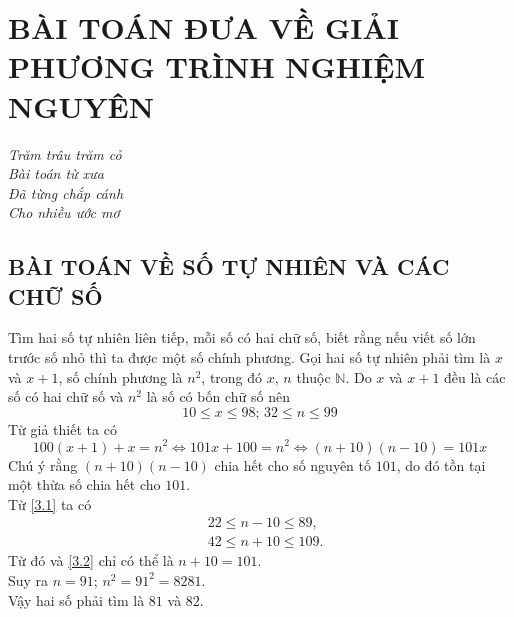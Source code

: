 \chapter{BÀI TOÁN ĐƯA VỀ GIẢI PHƯƠNG TRÌNH NGHIỆM NGUYÊN}

\begin{flushright}
 \textit{Trăm trâu trăm cỏ\\
 Bài toán từ xưa\\
 Đã từng chắp cánh\\
 Cho nhiều ước mơ}
\end{flushright}

\section{BÀI TOÁN VỀ SỐ TỰ NHIÊN VÀ CÁC CHỮ SỐ}

\begin{vd}
 Tìm hai số tự nhiên liên tiếp, mỗi số có hai chữ số, biết rằng nếu viết số lớn trước số nhỏ thì ta được một số chính phương.
 \loigiai
  {
  Gọi hai số tự nhiên phải tìm là $x$ và $x + 1$, số chính phương là $n^2$, trong đó $x$, $n$ thuộc $\mathbb{N}$. Do $x$ và $x + 1$ đều là các số có hai chữ số và $n^2$ là số có bốn chữ số nên
  \begin{equation}
   10 \leq x \leq 98; \, 32 \leq n \leq 99 \label{3.1}
  \end{equation}
  Từ giả thiết ta có
  \begin{equation}
   100(x + 1) + x = n^2 \Leftrightarrow 101x + 100 = n^2 \Leftrightarrow (n + 10)(n - 10) = 101x \label{3.2}
  \end{equation}
  Chú ý rằng $(n + 10)(n - 10)$ chia hết cho số nguyên tố $101$, do đó tồn tại một thừa số chia hết cho $101$.\\
  Từ \eqref{3.1} ta có
  \begin{align*}
   & 22 \leq n - 10 \leq 89, \\
   & 42 \leq n + 10 \leq 109.
  \end{align*}
  Từ đó và \eqref{3.2} chỉ có thể là $n + 10 = 101$.\\
  Suy ra $n = 91$; $n^2 = 91^2 = 8281$.\\
  Vậy hai số phải tìm là $81$ và $82$.
  }
\end{vd}

